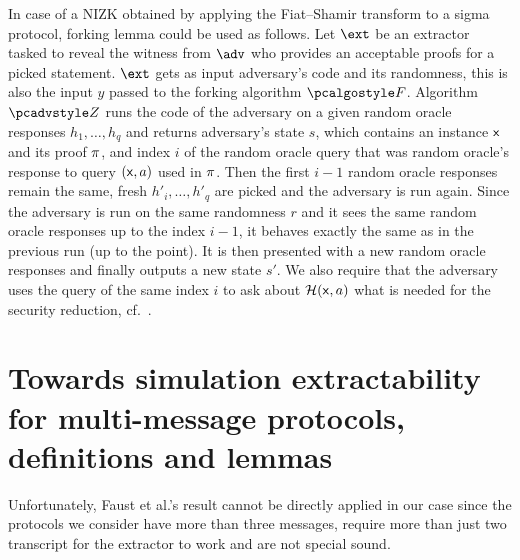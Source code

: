 \let\accentvec\vec \documentclass[runningheads,10pt]{llncs}
\begin{document}
In case of a NIZK obtained by applying the Fiat--Shamir transform to a sigma protocol, forking lemma could be used as follows.
Let $\ext$ be an extractor tasked to reveal the witness from $\adv$ who
provides an acceptable proofs for a picked statement. $\ext$ gets as input adversary's
code and its randomness, this is also the input $y$ passed to the forking
algorithm $\forking$. Algorithm $\zdv$ runs the code of the adversary on a
given random oracle responses $h_1, \ldots, h_q$ and returns adversary's
state $s$, which contains an instance $\mathsf{x}$ and its proof $\pi$, and index $i$ of the random oracle query that was random oracle's
response to query $(\mathsf{x}, a)$ used in $\pi$. Then the first $i - 1$
random oracle responses remain the same, fresh $h'_i, \ldots, h'_q$ are
picked and the adversary is run again. Since the adversary is run on the same
randomness $r$ and it sees the same random oracle responses up to the index $i
- 1$, it behaves exactly the same as in the previous run (up to the point). It
is then presented with a new random oracle responses and finally outputs a new
state $s'$. We also require that the adversary uses the query of the same
index $i$ to ask about $\mathcal{H}(\mathsf{x}, a)$ what is needed for the security
reduction, cf.~\cite{CCS:BelNev06}.


\section{Towards simulation extractability for multi-message
protocols, definitions and lemmas}
Unfortunately, Faust et al.'s result cannot be directly applied in our case
since the protocols we consider have more than three messages,
require more than just two transcript for the extractor to work and are not special sound.
\end{document}
